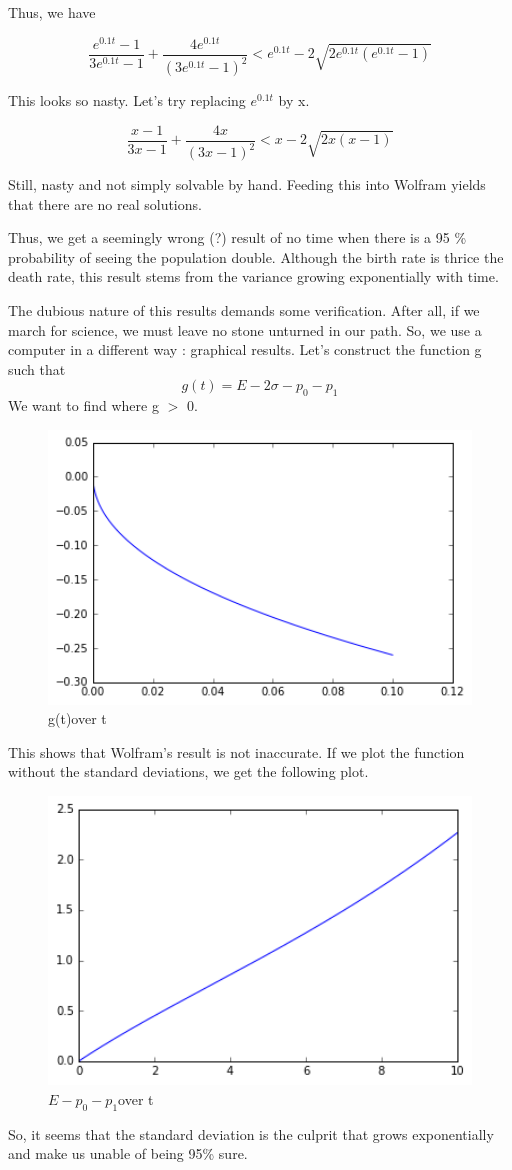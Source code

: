 \documentclass[a4paper,12pt]{article}
\begin{document}
Thus, we have 

\[\frac{e^{0.1t} -1}{3e^{0.1t} -1} +\frac{4e^{0.1t}}{(3e^{0.1t} -1)^2}<e^{0.1t} -2\sqrt{2e^{0.1t}(e^{0.1t}- 1)}\]

This looks so nasty. Let's try replacing $e^{0.1t}$ by x.

\[\frac{x -1}{3x -1} +\frac{4x}{(3x -1)^2}<x -2\sqrt{2x(x- 1)}\]

Still, nasty and not simply solvable by hand. Feeding this into Wolfram yields that there are no real solutions.

Thus, we get a seemingly wrong (?) result of no time when there is a 95 \% probability of seeing the population double. Although the birth rate is thrice the death rate, this result stems from the variance growing exponentially with time.

The dubious nature of this results demands some verification. After all, if we march for science, we must leave no stone unturned in our path. So, we use a computer in a different way : graphical results. 
Let's construct the function g such that
\[g(t)= E- 2\sigma-p_0 - p_1 \]
We want to find where g $>$ 0.
\begin{figure}[H] 
	\centering
	\includegraphics[width=14cm]{37a}
	\caption{g(t)over t}
	\end{figure}

This shows that Wolfram's result is not inaccurate.  If we plot the function without the standard deviations, we get the following plot.
\begin{figure}[H] 
	\centering
	\includegraphics[width=12cm]{37b}
	\caption{$E-p_0 - p_1$over t}
\end{figure}

So, it seems that the standard deviation is the culprit that grows exponentially and make us  unable of being 95\% sure.
\end{document}
